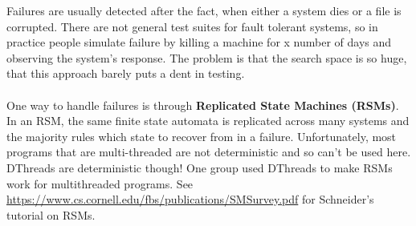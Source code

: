 \documentclass[twoside]{article}
\begin{document}
Failures are usually detected after the fact, when either a system dies or a file is corrupted.  There are not general test suites for fault tolerant systems, so in practice people simulate failure by killing a machine for x number of days and observing the system's response.  The problem is that the search space is so huge, that this approach barely puts a dent in testing.\\
\\
One way to handle failures is through \textbf{Replicated State Machines (RSMs)}.  In an RSM, the same finite state automata is replicated across many systems and the majority rules which state to recover from in a failure.  Unfortunately, most programs that are multi-threaded are not deterministic and so can't be used here.  DThreads are deterministic though!  One group used DThreads to make RSMs work for multithreaded programs.  See \url{https://www.cs.cornell.edu/fbs/publications/SMSurvey.pdf} for Schneider's tutorial on RSMs.
\end{document}
